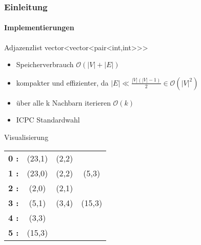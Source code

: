 \begin{frame}
    \frametitle{Einleitung}
    \framesubtitle{Implementierungen}
    \begin{KITexampleblock}{Adjazenzlist}
    vector<vector<pair<int,int>{}>{}>
    \begin{itemize}
        \item Speicherverbrauch \( \mathcal{O}(|V|+|E|)\)
        \item kompakter und effizienter, da \( |E| \ll \frac{|V| (|V| - 1)}{2} \in \mathcal{O}(|V|^2)\)
        \item über alle k Nachbarn iterieren \( \mathcal{O}(k)\)
        \item ICPC Standardwahl
    \end{itemize}
    \end{KITexampleblock}
    \vspace{0.001em}
    \begin{KITinfoblock}{Visualisierung}
    \begin{tabular}{l c c c}
        \textbf{0 :  } & (23,1) & (2,2) \\
        \textbf{1 :  } & (23,0) & (2,2) & (5,3) \\
        \textbf{2 :  } & (2,0) & (2,1) \\
        \textbf{3 :  } & (5,1) & (3,4) & (15,3) \\
        \textbf{4 :  } & (3,3) \\
        \textbf{5 :  } & (15,3) \\
    \end{tabular}
    \end{KITinfoblock}
\end{frame}

